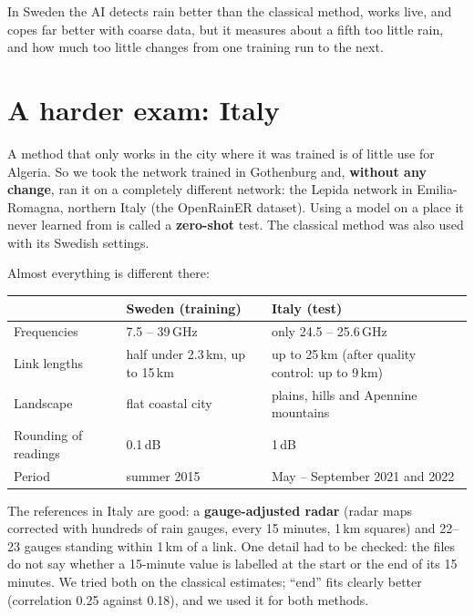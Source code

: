 \begin{oneline}
In Sweden the AI detects rain better than the classical method, works live, and copes far better with coarse data, but
it measures about a fifth too little rain, and how much too little changes from one training run to the next.
\end{oneline}

\section{A harder exam: Italy}
\label{sec:italy}

A method that only works in the city where it was trained is of little use for Algeria. So we took the network trained
in Gothenburg and, \textbf{without any change}, ran it on a completely different network: the Lepida network in
Emilia-Romagna, northern Italy (the OpenRainER dataset). Using a model on a place it never learned from is called a
\textbf{zero-shot} test. The classical method was also used with its Swedish settings.

Almost everything is different there:
\begin{center}\small
\begin{tabular}{p{3.4cm}p{4.6cm}p{5.6cm}}
\toprule
& Sweden (training) & Italy (test)\\
\midrule
Frequencies & 7.5 -- 39\,GHz & only 24.5 -- 25.6\,GHz\\
Link lengths & half under 2.3\,km, up to 15\,km & up to 25\,km (after quality control: up to 9\,km)\\
Landscape & flat coastal city & plains, hills and Apennine mountains\\
Rounding of readings & 0.1\,dB & 1\,dB\\
Period & summer 2015 & May -- September 2021 and 2022\\
\bottomrule
\end{tabular}
\end{center}

The references in Italy are good: a \textbf{gauge-adjusted radar} (radar maps corrected with hundreds of rain gauges,
every 15 minutes, 1\,km squares) and 22--23 gauges standing within 1\,km of a link. One detail had to be checked: the files
do not say whether a 15-minute value is labelled at the start or the end of its 15 minutes. We tried both on the classical
estimates; ``end'' fits clearly better (correlation 0.25 against 0.18), and we used it for both methods.


